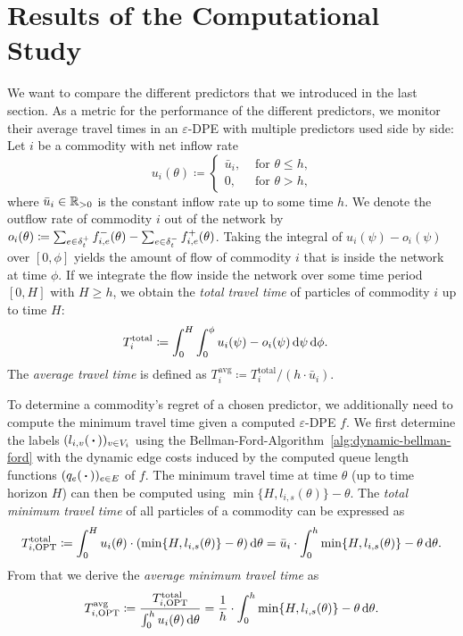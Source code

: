 \section{Results of the Computational Study}\label{sec:results}

We want to compare the different predictors that we introduced in the last section.
As a metric for the performance of the different predictors, we monitor their average travel times in an $\varepsilon$-DPE with multiple predictors used side by side:
Let $i$ be a commodity with net inflow rate
\[
    u_i(\theta) \coloneqq \begin{cases}
        \bar{u}_i, &\text{ for $\theta \leq h$,}\\
        0, &\text{ for $\theta > h$,}
    \end{cases}
\]
where $\bar{u}_i\in\mathbb{R}_{>0}$ is the constant inflow rate up to some time $h$. 
We denote the outflow rate of commodity $i$ out of the network by  $o_i(\theta) \coloneqq \sum_{e\in\delta^+_{t}} f_{i,e}^-(\theta) - \sum_{e\in\delta^-_{t}} f_{i,e}^+(\theta)$.
Taking the integral of $u_i(\psi) - o_i(\psi)$ over $[0, \phi]$ yields the amount of flow of commodity $i$ that is inside the network at time $\phi$.
If we integrate the flow inside the network over some time period $[0, H]$ with $H \geq h$, we obtain the \emph{total travel time} of particles of commodity $i$ up to time $H$:
\begin{align*}
    T^{\text{total}}_i
    &\coloneqq\int_0^H \int_0^\phi u_i(\psi) - o_{i}(\psi) \,\textnormal{d}\psi \,\textnormal{d} \phi.
\end{align*}
The \emph{average travel time} is defined as $T^{\text{avg}}_i\coloneqq  T_i^{\text{total}} / (h\cdot \bar{u}_i)$.

To determine a commodity's regret of a chosen predictor, we additionally need to compute the minimum travel time given a computed $\varepsilon$-DPE $f$.
We first determine the labels $(l_{i,v}(\,\boldsymbol{\cdot}\,))_{v\in V_i}$ using the Bellman-Ford-Algorithm~\ref{alg:dynamic-bellman-ford} with the dynamic edge costs induced by the computed queue length functions $(q_e(\,\boldsymbol{\cdot}\,))_{e\in E}$ of $f$.
The minimum travel time at time $\theta$ (up to time horizon $H$) can then be computed using $\min\{H, l_{i,s}(\theta)\} - \theta$.
The \emph{total minimum travel time} of all particles of a commodity can be expressed as
\[
    T^{\mathrm{total}}_{i, \text{OPT}}
    \coloneqq \int_0^H u_i(\theta)\cdot (\min\{H, l_{i,s}(\theta)\} - \theta) \,\textnormal{d} \theta
    = \bar u_i \cdot \int_0^h \min\{H, l_{i,s}(\theta)\} - \theta \,\textnormal{d} \theta.
\]
From that we derive the \emph{average minimum travel time} as
\[
    T^{\mathrm{avg}}_{i, \text{OPT}}
    \coloneqq \frac{T^{\mathrm{total}}_{i, \text{OPT}}}{\int_0^h u_i(\theta)\,\textnormal{d} \theta} = \frac{1}{h}\cdot \int_0^h \min\{H, l_{i,s}(\theta)\} - \theta \,\textnormal{d} \theta.
\]


